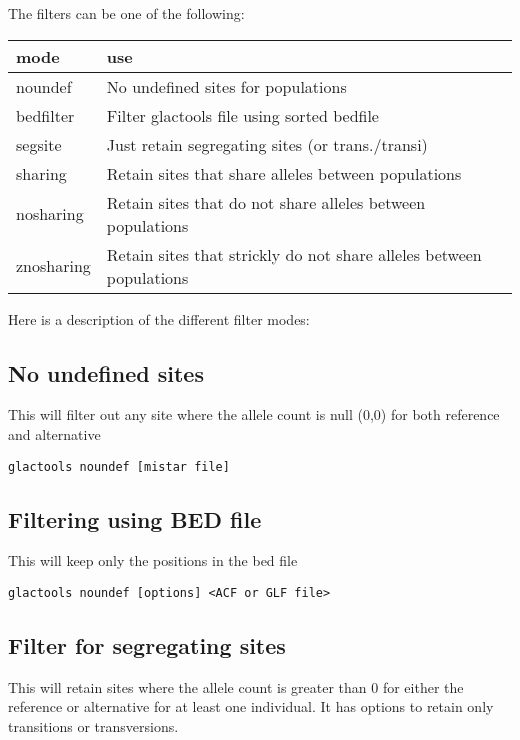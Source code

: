\documentclass[a4paper]{article}
\begin{document}
The filters can be one of the following:

\begin{tabular}{ll}
\hline
mode & use \\
\hline
noundef      &   No undefined sites for populations \\
bedfilter    &   Filter glactools file using sorted bedfile \\
segsite      &   Just retain segregating sites (or trans./transi) \\
sharing      &   Retain sites that share alleles between populations \\
nosharing    &   Retain sites that do not share alleles between populations \\
znosharing   &   Retain sites that strickly do not share alleles between populations \\
\end{tabular}

Here is a description of the different filter modes:

\subsection{No undefined sites}

\noindent This will filter out any site where the allele count is null (0,0) for both reference and alternative

\begin{lstlisting}
glactools noundef [mistar file]
\end{lstlisting}


\subsection{Filtering using BED file}

\noindent This will keep only the positions in the bed file

\begin{lstlisting}
glactools noundef [options] <ACF or GLF file>
\end{lstlisting}

\subsection{Filter for segregating sites}

\noindent This will retain sites where the allele count is greater than 0 for either the reference or alternative for at least one individual. It has options to retain only transitions or transversions. 
\end{document}
